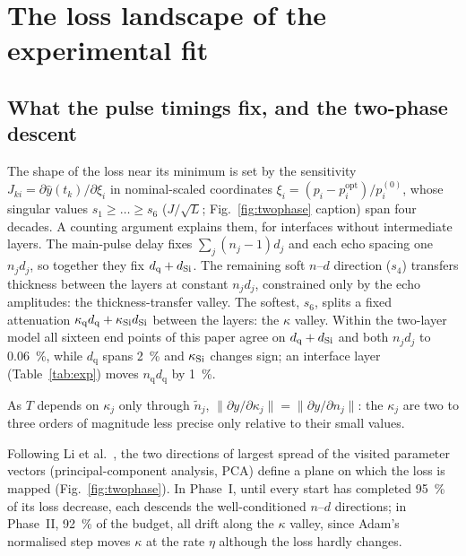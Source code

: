 \documentclass{optica-article}
\newcommand{\kap}{\kappa}
\newcommand{\nq}{n_{\mathrm q}}\newcommand{\kq}{\kap_{\mathrm q}}\newcommand{\dq}{d_{\mathrm q}}
\begin{document}
\section{The loss landscape of the experimental fit}\label{sec:landscape}
\subsection{What the pulse timings fix, and the two-phase descent}\label{sec:sens}
The shape of the loss near its minimum is set by the sensitivity $J_{ki}=\partial\hat y(t_k)/\partial \xi_i$ \cite{Kay1993,Aster2018} in nominal-scaled coordinates $\xi_i=(p_i-p_i^{\mathrm{opt}})/p_i^{(0)}$, whose singular values $s_1\ge\dots\ge s_6$ ($J/\sqrt L$; Fig.~\ref{fig:twophase} caption) span four decades. A counting argument explains them, for interfaces without intermediate layers. The main-pulse delay fixes $\sum_j(n_j-1)d_j$ and each echo spacing one $n_jd_j$, so together they fix $\dq+\dS$. The remaining soft $n$--$d$ direction ($s_4$) transfers thickness between the layers at constant $n_jd_j$, constrained only by the echo amplitudes: the thickness-transfer valley. The softest, $s_6$, splits a fixed attenuation $\kq\dq+\kS\dS$ between the layers: the $\kap$ valley. Within the two-layer model all sixteen end points of this paper agree on $\dq+\dS$ and both $n_jd_j$ to \SI{0.06}{\percent}, while $\dq$ spans \SI{2}{\percent} and $\kS$ changes sign; an interface layer (Table~\ref{tab:exp}) moves $\nq\dq$ by \SI{1}{\percent}.

As $T$ depends on $\kap_j$ only through $\tilde n_j$, $\lVert\partial y/\partial\kap_j\rVert=\lVert\partial y/\partial n_j\rVert$: the $\kap_j$ are two to three orders of magnitude less precise only relative to their small values.

Following Li et al.\ \cite{Li2018}, the two directions of largest spread of the visited parameter vectors (principal-component analysis, PCA) define a plane on which the loss is mapped (Fig.~\ref{fig:twophase}). In Phase~I, until every start has completed \SI{95}{\percent} of its loss decrease, each descends the well-conditioned $n$--$d$ directions; in Phase~II, \SI{92}{\percent} of the budget, all drift along the $\kap$ valley, since Adam's normalised step moves $\kap$ at the rate $\eta$ although the loss hardly changes.
\end{document}
